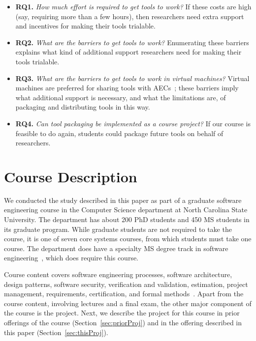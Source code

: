 \documentclass[10pt,conference]{IEEEtran}
\begin{document}
\begin{itemize}
  
\item\textbf{RQ1.} \textit{How much effort is required to get tools to work?}
If these costs are high (say, requiring more than a few hours), 
then researchers need extra support and incentives for 
making their tools trialable.

\item\textbf{RQ2.} \textit{What are the barriers to get tools to work?}
Enumerating these barriers explains what kind of additional
support researchers need for making their tools trialable.

\item\textbf{RQ3.} \textit{What are the barriers to get tools to work in virtual machines?}
Virtual machines are preferred for sharing tools with AECs~\cite{guidelines}; 
these barriers imply what additional support is
necessary, and what the limitations are, of packaging and 
distributing tools in this way.

\item\textbf{RQ4.} \textit{Can tool packaging be implemented as a course project?}
If our course is feasible to do again, 
students could package future tools on behalf of researchers.
\end{itemize}

\section{Course Description}

We conducted the study described in this paper as 
part of a graduate software engineering course
in the Computer Science department at 
North Carolina State University.
The department has about 200 PhD students and 450
MS students in its graduate program.
While graduate students are not required to
take the course, it is one of seven core systems
courses, from which students must take one course.
The department does have a specialty MS degree
track in software 
engineering~\cite{mstrack},
which does require this course.

Course content covers software engineering processes,
software architecture, design patterns, software security,
verification and validation, estimation, project management,
requirements, certification, and formal 
methods~\cite{syllabus}.
Apart from the course content, involving lectures and
a final exam, the other
major component of the course is the project.
Next, we describe the project for this course 
in prior offerings of the course (Section~\ref{sec:priorProj})
and in the offering described in this paper (Section~\ref{sec:thisProj}).
\end{document}
